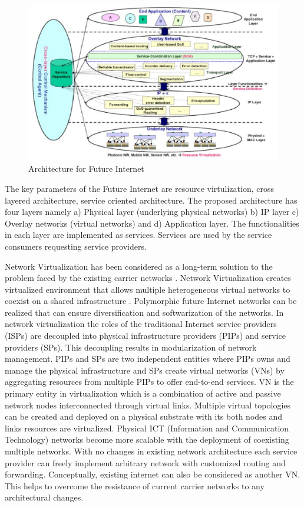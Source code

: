 \documentclass[article,dr=phil,type=msc ,colorback,accentcolor=tud4b]{tudthesis}
\begin{document}
  \begin{figure}[h]
 	\centering
 	\includegraphics[width=16cm]{FCN_arc}
 	\caption{Architecture for Future Internet}
 	\label{fig: Future Network Architecture}
 \end{figure}
 The key parameters of the Future Internet are resource virtulization, cross layered architecture, service oriented architecture. The proposed architecture has four layers namely a) Physical layer (underlying physical networks) b) IP layer c) Overlay networks (virtual networks) and d) Application layer. The functionalities in each layer are implemented as services. Services are used by the service consumers requesting service providers. \newline
  
 \hspace*{0.5cm}
Network Virtualization has been considered as a long-term solution to the problem faced by the existing carrier networks \cite{1432642}. Network Virtualization creates virtualized environment that allows multiple heterogeneous virtual networks to coexist on a shared infrastructure \cite{nw_virt}. Polymorphic future Internet networks can be realized that can ensure diversification and softwarization of the networks. In network virtualization the roles of the traditional Internet service providers (ISPs) are decoupled into physical infrastructure providers (PIPs) and service providers (SPs). This decoupling results in modularization of network management. PIPs and SPs are two independent entities where PIPs owns and manage the physical infrastructure and SPs create virtual networks (VNs) by aggregating resources from multiple PIPs to offer end-to-end services. VN is the primary entity in virtualization which is a combination of active and passive network nodes interconnected through virtual links. Multiple virtual topologies can be created and deployed on a physical substrate with its both nodes and links resources are virtualized. Physical ICT (Information and Communication Technology) networks become more scalable with the deployment of coexisting multiple networks. With no changes in existing network architecture each service provider can freely implement arbitrary network with customized routing and forwarding. Conceptually, existing internet can also be considered as another VN. This helps to overcome the resistance of current carrier networks to any architectural changes.\newline
 
\end{document}
